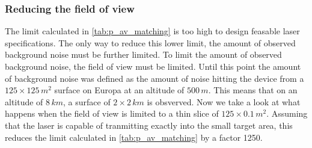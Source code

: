 \subsubsection{Reducing the field of view}
The limit calculated in \cref{tab:p_av_matching} is too high to design feasable laser specifications. The only way to reduce this lower limit, the amount of observed background noise must be further limited. To limit the amount of observed background noise, the field of view must be limited. Until this point the amount of background noise was defined as the amount of noise hitting the device from a $125\times125\,m^2$ surface on Europa at an altitude of $500\,m$. This means that on an altitude of $8\,km$, a surface of $2\times2\,km$ is obsverved. Now we take a look at what happens when the field of view is limited to a thin slice of $125\times0.1\,m^2$. Assuming that the laser is capable of tranmitting exactly into the small target area, this reduces the limit calculated in \cref{tab:p_av_matching} by a factor 1250. 